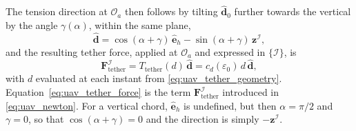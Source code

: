 The tension direction at $\mathcal{O}_a$ then follows by tilting $\hat{\mathbf{d}}_0$ further towards the vertical by the angle $\gamma(\alpha)$, within the same plane,
\begin{equation}
    \hat{\mathbf{d}} = \cos(\alpha+\gamma)\,\hat{\mathbf{e}}_h - \sin(\alpha+\gamma)\,\mathbf{z}^{\mathcal{I}},
    \label{eq:uav_tether_direction}
\end{equation}
and the resulting tether force, applied at $\mathcal{O}_a$ and expressed in $\{\mathcal{I}\}$, is
\begin{equation}
    \mathbf{F}_{\mathrm{tether}}^{\mathcal{I}} = T_{\mathrm{tether}}(d)\,\hat{\mathbf{d}} = c_d(\varepsilon_0)\,d\,\hat{\mathbf{d}},
    \label{eq:uav_tether_force}
\end{equation}
with $d$ evaluated at each instant from \eqref{eq:uav_tether_geometry}. Equation~\eqref{eq:uav_tether_force} is the term $\mathbf{F}_{\mathrm{tether}}^{\mathcal{I}}$ introduced in \eqref{eq:uav_newton}. For a vertical chord, $\hat{\mathbf{e}}_h$ is undefined, but then $\alpha = \pi/2$ and $\gamma = 0$, so that $\cos(\alpha+\gamma) = 0$ and the direction is simply $-\mathbf{z}^{\mathcal{I}}$.